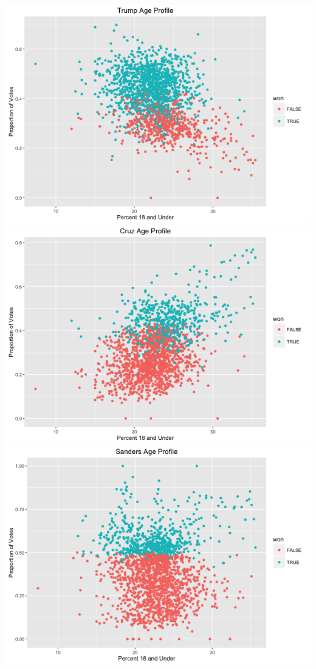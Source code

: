 \documentclass[11pt]{article}
\begin{document}
\includegraphics[scale=0.38]{../exploratory_plots/Trump_Age.png}
\includegraphics[scale=0.38]{../exploratory_plots/Cruz_Age.png}\\
\includegraphics[scale=0.38]{../exploratory_plots/Sanders_Age.png}
\end{document}
